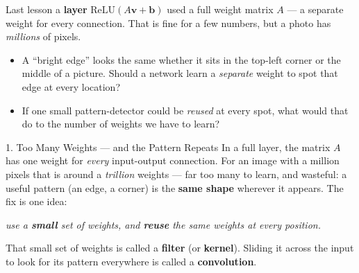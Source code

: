 \documentclass[10pt]{article}
\newcommand{\vv}{\mathbf{v}}
\newcommand{\bb}{\mathbf{b}}
\newcommand{\relu}{\mathrm{ReLU}}
\begin{document}
\begin{hookbox}
Last lesson a \textbf{layer} $\relu(A\vv+\bb)$ used a full weight matrix $A$ --- a separate weight for every
connection. That is fine for a few numbers, but a photo has \emph{millions} of pixels.
\begin{itemize}\setlength{\itemsep}{1pt}
  \item A ``bright edge'' looks the same whether it sits in the top-left corner or the middle of a picture. Should a network learn a \emph{separate} weight to spot that edge at every location? 
  \item If one small pattern-detector could be \emph{reused} at every spot, what would that do to the number of weights we have to learn? 
\end{itemize}
\end{hookbox}

\begin{notesbox}{1. Too Many Weights --- and the Pattern Repeats}
In a full layer, the matrix $A$ has one weight for \emph{every} input-output connection. For an image with a
million pixels that is around a \emph{trillion} weights --- far too many to learn, and wasteful: a useful
pattern (an edge, a corner) is the \textbf{same shape} wherever it appears. The fix is one idea:
\begin{center}
\emph{use a \textbf{small} set of weights, and \textbf{reuse} the same weights at every position.}
\end{center}
That small set of weights is called a \textbf{filter} (or \textbf{kernel}). Sliding it across the input to
look for its pattern everywhere is called a \textbf{convolution}.
\end{notesbox}
\end{document}
